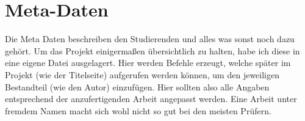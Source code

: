 
\chapter{Meta-Daten}

Die Meta Daten beschreiben den Studierenden und alles was sonst noch dazu gehört. Um das Projekt einigermaßen übersichtlich zu halten, habe ich diese in eine eigene Datei ausgelagert. Hier werden Befehle erzeugt, welche später im Projekt (wie der Titelseite) aufgerufen werden können, um den jeweiligen Bestandteil (wie den Autor) einzufügen. Hier sollten also alle Angaben entsprechend der anzufertigenden Arbeit angepasst werden. Eine Arbeit unter fremdem Namen macht sich wohl nicht so gut bei den meisten Prüfern.
